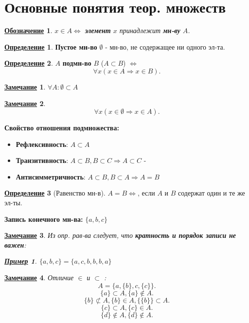 \documentclass[12pt]{article}
\newtheorem*{note}{\underline{Замечание}}
\newtheorem*{symb}{\underline{Обозначение}}
\newtheorem*{example}{\underline{Пример}}
\theoremstyle{definition}
\newtheorem{definition}{\underline{Определение}}[section]
\theoremstyle{definition}
\begin{document}
\section{Основные понятия теор. множеств}
\begin{symb}
    $x \in A \iff$ \textbf{элемент } $x$ принадлежит \textbf{мн-ву} $A$.
\end{symb}
\begin{definition}
    \textbf{Пустое мн-во} $\emptyset$ - мн-во, не содержащее ни одного эл-та.
\end{definition}
\begin{definition}
    $A$ \textbf{подмн-во} $B$ ($A \subset B$) $\iff$ 
    \[
    \forall x (x \in A \Rightarrow x \in B)
    .\] 
\end{definition}
\begin{note}
    $\forall A \colon \emptyset \subset A$
\end{note}
\begin{note}
\[
\forall x (x \in \emptyset \Rightarrow x \in A)
.\] 
\end{note}
\textbf{Свойство отношения подмножества:}
\begin{itemize}
    \item \textbf{Рефлексивность}: $A \subset A$
    \item\textbf{Транзитивность}: $A \subset B, B \subset C \Rightarrow A \subset C$ - 
    \item \textbf{Антисимметричность}: $A \subset B, B \subset A \Rightarrow A = B$
\end{itemize}
\begin{definition}[Равенство мн-в]
$A = B \iff $, если $A$ и $B$ содержат один и те же эл-ты.
\end{definition}
\textbf{Запись конечного мн-ва:} $\{a, b, c\}$
 \begin{note}
 Из опр. рав-ва следует, что \textbf{кратность и порядок записи не важен}:
 \begin{example}
    $\{a, b, c\} = \{a, c, b, b, b, a\}$
 \end{example}
 
\end{note}
 
\begin{note}
Отличие $\in$ и $\subset$ :
\[
A = \{a, \{b\}, c, \{c\}\}
.\] 
\[
\{a\} \subset A, \{a\} \not\in A
.\]  
\[
\{b\} \not\subset A, \{b\} \in A, \{\{b\}\} \subset A
.\] 
\[
\{c\} \subset A, \{c\}\in A
.\] 
\[
\{d\} \not\in A, \{ d\}\not\in A 
.\] 
\end{note}
\end{document}
